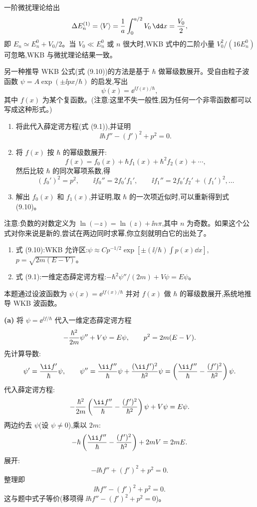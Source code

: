 \begin{question}
\begin{solution}
一阶微扰理论给出
\[
\Delta E_n^{(1)}=\langle V\rangle
={1\over a}\int_0^{a/2}V_0\,\dd x={V_0\over2},
\]
即 $E_n\simeq E_n^0+V_0/2$。当 $V_0\ll E_n^0$ 或 $n$ 很大时,WKB 式中的二阶小量 $V_0^2/(16E_n^0)$ 可忽略,WKB 与微扰理论结果一致。
\end{solution}
\end{question}

\begin{question}
另一种推导 WKB 公式(式 (9.10))的方法是基于 $\hbar$ 做幂级数展开。受自由粒子波函数 $\psi=A\exp(\pm \ii px/\hbar)$ 的启发,写出
\[
\psi(x)=\ee^{\ii f(x)/\hbar},
\]
其中 $f(x)$ 为某个复函数。(注意:这里不失一般性,因为任何一个非零函数都可以写成这种形式。)
\begin{enumerate}
\item 将此代入薛定谔方程(式 (9.1)),并证明
\[
\ii\hbar f''-(f')^2+p^2=0.
\]
\item 将 $f(x)$ 按 $\hbar$ 的幂级数展开:
\[
f(x)=f_0(x)+\hbar f_1(x)+\hbar^2f_2(x)+\cdots,
\]
然后比较 $\hbar$ 的同次幂项系数,得
\[
(f_0')^2=p^2,\qquad \ii f_0''=2f_0'f_1',\qquad \ii f_1''=2f_0'f_2'+(f_1')^2,\ldots
\]
\item 解出 $f_0(x)$ 和 $f_1(x)$,并证明,取 $\hbar$ 的一次项近似时,可以重新得到式 (9.10)。
\end{enumerate}
注意:负数的对数定义为 $\ln(-z)=\ln(z)+\ii n\pi$,其中 $n$ 为奇数。如果这个公式对你来说是新的,尝试在两边同时求幂,你立刻就明白它的出处了。

\par\smallskip
{}
\begin{enumerate}[leftmargin=2.2em,itemsep=0.12em,topsep=0.12em,parsep=0pt]
\item 式 (9.10):WKB 允许区:$\psi\approx C p^{-1/2}\exp[\pm(\ii/\hbar)\int p(x)\dd x]$,$p=\sqrt{2m(E-V)}$。
\item 式 (9.1):一维定态薛定谔方程:$-\hbar^2\psi''/(2m)+V\psi=E\psi$。
\end{enumerate}

\begin{solution}
本题通过设波函数为 $\psi(x)=\ee^{\ii f(x)/\hbar}$ 并对 $f(x)$ 做 $\hbar$ 的幂级数展开,系统地推导 WKB 波函数。

\textbf{(a)} 将 $\psi=\ee^{\ii f/\hbar}$ 代入一维定态薛定谔方程
\[
-{\hbar^2\over2m}\psi''+V\psi=E\psi,
\qquad p^2=2m(E-V).
\]
先计算导数:
\[
\psi'={\ii f'\over\hbar}\psi,
\qquad
\psi''={\ii f''\over\hbar}\psi+{({\ii f'})^2\over\hbar^2}\psi
=\left({\ii f''\over\hbar}-{(f')^2\over\hbar^2}\right)\psi.
\]
代入薛定谔方程:
\[
-{\hbar^2\over2m}\left({\ii f''\over\hbar}-{(f')^2\over\hbar^2}\right)\psi+V\psi=E\psi.
\]
两边约去 $\psi$(设 $\psi\neq0$),乘以 $2m$:
\[
-\hbar\left({\ii f''\over\hbar}-{(f')^2\over\hbar^2}\right)+2mV=2mE.
\]
展开:
\[
-\ii\hbar f''+(f')^2+p^2=0.
\]
整理即
\[
\ii\hbar f''-(f')^2+p^2=0.
\]
这与题中式子等价(移项得 $\ii\hbar f''-(f')^2+p^2=0$)。


\end{solution}
\end{question}

